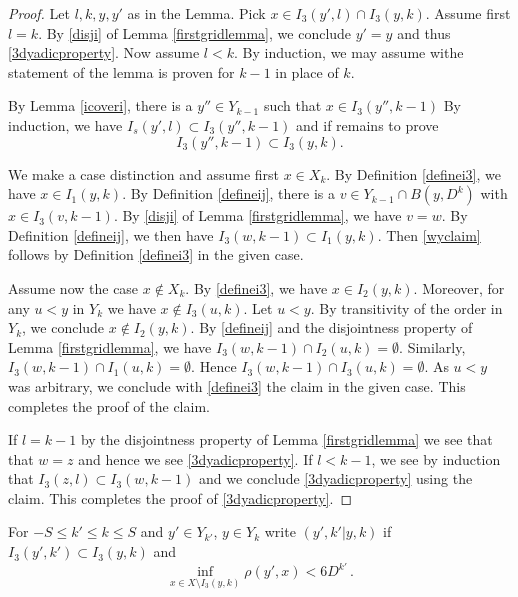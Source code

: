 \begin{proof}
Let $l,k,y,y'$ as in the Lemma.
Pick $x\in I_3(y',l)\cap I_3(y,k)$.
Assume first $l=k$. By \eqref{disji} of Lemma
\ref{firstgridlemma}, we conclude $y'=y$
and thus \eqref{3dyadicproperty}.
Now assume $l<k$. By induction, we may assume
    withe statement of the lemma is proven for $k-1$ in place of $k$.

By Lemma \ref{icoveri}, there is
a $y''\in Y_{k-1}$ such that $x\in I_3(y'',k-1)$
By induction, we have $I_s(y',l)\subset I_3(y'',k-1)$
and if remains to prove
\begin{equation}\label{wyclaim}
I_3(y'',k-1)\subset I_3(y,k).
\end{equation}

We make a case distinction and assume first $x\in X_k$.
By Definition \eqref{definei3}, we have
    $x\in I_1(y,k)$. By Definition \eqref{defineij}, there is a $v\in Y_{k-1}\cap B(y,D^k)$ with $x\in I_3(v,k-1)$.
By \eqref{disji} of Lemma \ref{firstgridlemma}, we have $v=w$.
By Definition \eqref{defineij}, we then have
$I_3(w,k-1)\subset I_1(y,k)$.
Then \eqref{wyclaim} follows by Definition \eqref{definei3} in the given case.

Assume now the case $x\notin X_k$.
By \eqref{definei3}, we have
    $x\in I_2(y,k)$. Moreover, for any $u<y$ in
    $Y_k$ we have $x\not\in I_3(u,k)$.
    Let $u<y$. By transitivity of the order in $Y_k$, we conclude $x\not \in I_2(y,k)$.
By \eqref{defineij} and the disjointness property of Lemma \ref{firstgridlemma}, we have
$I_3(w,k-1)\cap  I_2(u,k)= \emptyset$.
Similarly, $I_3(w,k-1)\cap  I_1(u,k)= \emptyset$.
Hence $I_3(w,k-1)\cap  I_3(u,k)=\emptyset$.
As $u<y$ was arbitrary, we conclude with
\eqref{definei3} the claim in the given case.
This completes the proof of the claim.

If $l=k-1$ by the disjointness property
of Lemma \ref{firstgridlemma} we see that
that $w=z$ and hence we see \eqref{3dyadicproperty}.
If $l<k-1$, we see by induction that
$I_3(z,l)\subset I_3(w,k-1)$ and we conclude
\eqref{3dyadicproperty} using the claim.
This completes the proof of \eqref{3dyadicproperty}.
\end{proof}




For $-S\le k'\le k\le S$ and $y'\in Y_{k'}$, $y\in Y_k$
write  $(y',k'|y,k)$ if $I_3(y',k')\subset I_3(y,k)$ and
\begin{equation}\label{bdcond}
    \inf_{x\in X\setminus I_3(y,k)}\rho(y',x)<6D^{k'}\, .
\end{equation}


